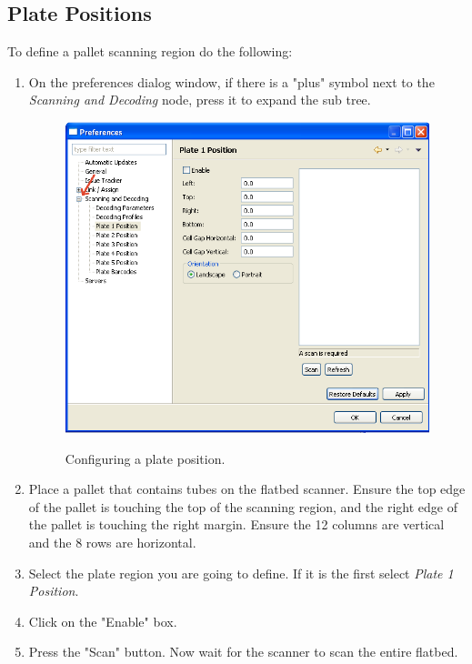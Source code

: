 \subsection{Plate Positions}
To define a pallet scanning region do the following:
\begin{enumerate}
  \item On the preferences dialog window, if there is a "plus" symbol next to
    the \emph{Scanning and Decoding} node, press it to expand the sub
    tree.
    \begin{figure}[H]
      \centering
      \scalebox{0.5}
      { \includegraphics*{screenshots/configuration/plate1_definition} }
      \caption{Configuring a plate position.}
      \label{fig:plate1_definition}
    \end{figure}
  \item Place a pallet that contains tubes on the flatbed scanner. Ensure the
    top edge of the pallet is touching the top of the scanning region, and the right
    edge of the pallet is touching the right margin. Ensure the 12 columns
    are vertical and the 8 rows are horizontal.
  \item Select the plate region you are going to define.  If it is the first
    select \emph{Plate 1 Position}.
  \item Click on the "Enable" box.
  \item Press the "Scan" button. Now wait for the scanner to scan the entire
    flatbed.
    \begin{figure}[H]

\end{figure}
\end{enumerate}
